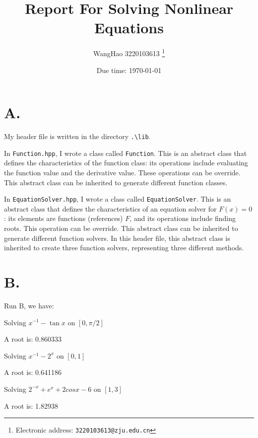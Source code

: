 \documentclass[a4paper]{article}
\begin{document}
\title{Report For Solving Nonlinear Equations}

\author{WangHao 3220103613
  \thanks{Electronic address: \texttt{3220103613@zju.edu.cn}}}


\date{Due time: \today}

\maketitle






\section*{A.}
My header file is written in the directory \texttt{.\textbackslash lib}.

In \texttt{Function.hpp}, I wrote a class called \texttt{Function}. 
This is an abstract class that defines the characteristics of the function class: 
its operations include evaluating the function value and the derivative value. 
These operations can be override. 
This abstract class can be inherited to generate different function classes.

In \texttt{EquationSolver.hpp}, I wrote a class called \texttt{EquationSolver}. 
This is an abstract class that defines the characteristics of an equation solver for \( F(x) = 0 \): 
its elements are functions (references) \( F \), and its operations include finding roots. 
This operation can be override. 
This abstract class can be inherited to generate different function solvers. 
In this header file, this abstract class is inherited to create three function solvers, 
representing three different methods.

\section*{B.}
Run B, we have:


Solving $x^{-1} - \tan x$ on $[0, \pi/2]$

A root is: 0.860333

Solving $x^{-1}-2^{x}$ on $[0,1]$

A root is: 0.641186

Solving $2^{-x}+e^{x}+2cosx-6$ on $[1,3]$

A root is: 1.82938
\end{document}
